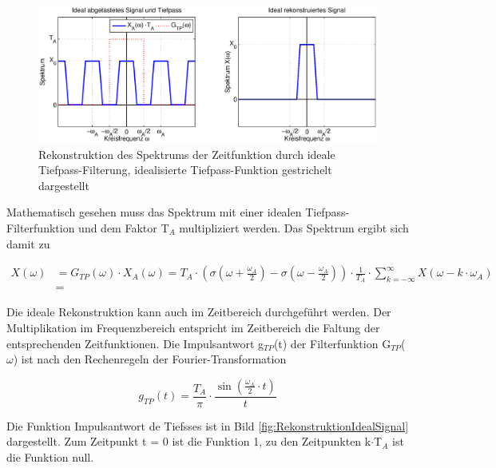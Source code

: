 \begin{figure}[H]
  \centerline{\includegraphics[width=1\textwidth]{Kapitel1/Bilder/image7}}
  \caption{Rekonstruktion des Spektrums der Zeitfunktion durch ideale Tiefpass-Filterung, idealisierte Tiefpass-Funktion gestrichelt dargestellt}
  \label{fig:RekonstruktionIdeal}
\end{figure}

\noindent Mathematisch gesehen muss das Spektrum mit einer idealen Tiefpass-Filterfunktion und dem Faktor T${}_{A}$ multipliziert werden. Das Spektrum ergibt sich damit zu

\begin{equation}\label{eq:twotwelve}
\begin{split}
X\left(\omega \right) & = G_{TP} \left(\omega \right)\cdot X_{A} \left(\omega \right)=T_{A} \cdot \left(\sigma \left(\omega +\frac{\omega _{A} }{2} \right)-\sigma \left(\omega -\frac{\omega _{A} }{2} \right)\right)\cdot \frac{1}{T_{A} } \cdot \sum _{k=-\infty }^{\infty }X\left(\omega -k\cdot \omega _{A} \right)\\
& =
\end{split}
\end{equation}


\noindent Die ideale Rekonstruktion kann auch im Zeitbereich durchgeführt werden. Der Multiplikation im Frequenzbereich entspricht im Zeitbereich die Faltung der entsprechenden Zeitfunktionen. Die Impulsantwort g$_{TP}$(t) der Filterfunktion G$_{TP}$($\omega$) ist nach den Rechenregeln der Fourier-Transformation 

\begin{equation}\label{eq:twothirteen}
g_{TP} \left(t\right)=\frac{T_{A} }{\pi } \cdot \frac{\sin \left(\frac{\omega _{A} }{2} \cdot t\right)}{t}
\end{equation}

\noindent Die Funktion Impulsantwort de Tiefsses ist in Bild \ref{fig:RekonstruktionIdealSignal} dargestellt. Zum Zeitpunkt t = 0 ist die Funktion 1, zu den Zeitpunkten k$\cdot$T${}_{A}$ ist die Funktion null.

